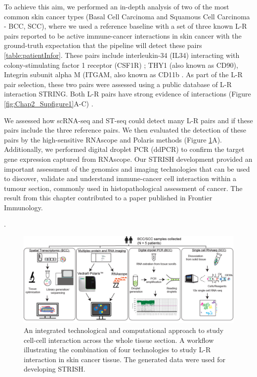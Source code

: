To achieve this aim, we performed an in-depth analysis of two of the most common skin cancer types (Basal Cell Carcinoma and Squamous Cell Carcinoma - BCC, SCC), where we used a reference baseline with a set of three known L-R pairs reported to be active immune-cancer interactions in skin cancer with the ground-truth expectation that the pipeline will detect these pairs \ref{table:patientInfor}. These pairs include interleukin-34 (IL34) interacting with colony-stimulating factor 1 receptor (CSF1R) \cite{lin2008discovery};  THY1 (also known as CD90), Integrin subunit alpha M (ITGAM, also known as CD11b \cite{wetzel2004human}. As part of the L-R pair selection, these two pairs were assessed using a public database of L-R interaction STRING. Both L-R pairs have strong evidence of interactions (Figure \ref{fig:Chap2_Supfigure1}A-C) \cite{jensen2009string}. 

We assessed how scRNA-seq and ST-seq could detect many L-R pairs and if these pairs include the three reference pairs. We then evaluated the detection of these pairs by the high-sensitive RNAscope and Polaris methods (Figure \ref{fig:Chap2_figure1}A). Additionally, we performed digital droplet PCR (ddPCR) to confirm the target gene expression captured from RNAscope. Our STRISH development provided an important assessment of the genomics and imaging technologies that can be used to discover, validate and understand immune-cancer cell interaction within a tumour section, commonly used in histopathological assessment of cancer. The result from this chapter contributed to a paper published in Frontier Immunology. 

\cite{tran2022robust}.  
\begin{figure}[htp]
    \centering
    \includegraphics[width=\columnwidth]{Chapter2/Figures/Chapter2_techsum_figure1.png}
    \caption[An integrated technological and computational approach to study cell-cell interaction across the whole tissue section.]{ An integrated technological and computational approach to study cell-cell interaction across the whole tissue section. A workflow illustrating the combination of four technologies to study L-R interaction in skin cancer tissue. The generated data were used for developing STRISH.}
    \label{fig:Chap2_figure1}
\end{figure}

